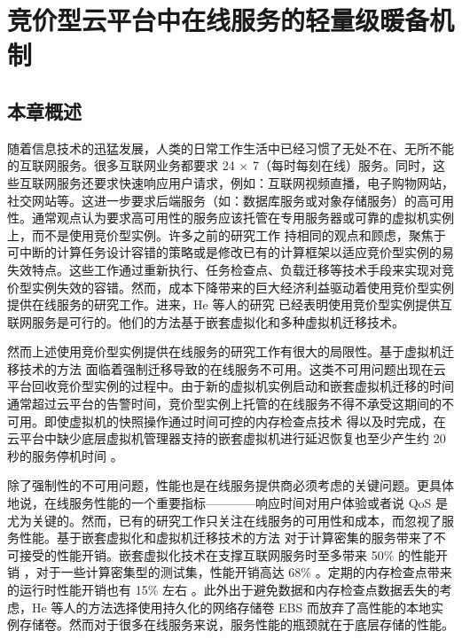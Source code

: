 \chapter{竞价型云平台中在线服务的轻量级暖备机制}
\label{cha:gemini}

\section{本章概述}
\label{sec:gemini_intro}
随着信息技术的迅猛发展，人类的日常工作生活中已经习惯了无处不在、无所不能的互联网服务。很多互联网业务都要求 24 $\times$ 7（每时每刻在线）服务。同时，这些互联网服务还要求快速响应用户请求，例如：互联网视频直播，电子购物网站，社交网站等。这进一步要求后端服务（如：数据库服务或对象存储服务）的高可用性。通常观点认为要求高可用性的服务应该托管在专用服务器或可靠的虚拟机实例上，而不是使用竞价型实例。许多之前的研究工作 \cite{chohan2010see, Liu:2011:CMC:2170444.2170450, song2012optimal, Yi:2010:RCS:1844768.1845343, Andrzejak:2010:DMC:1906481.1906533} 持相同的观点和顾虑，聚焦于可中断的计算任务设计容错的策略或是修改已有的计算框架以适应竞价型实例的易失效特点。这些工作通过重新执行、任务检查点、负载迁移等技术手段来实现对竞价型实例失效的容错。然而，成本下降带来的巨大经济利益驱动着使用竞价型实例提供在线服务的研究工作。进来，He 等人的研究 \cite{He:2015:CCH:2749246.2749275} 已经表明使用竞价型实例提供互联网服务是可行的。他们的方法基于嵌套虚拟化和多种虚拟机迁移技术。

然而上述使用竞价型实例提供在线服务的研究工作有很大的局限性。基于虚拟机迁移技术的方法 \cite{He:2015:CCH:2749246.2749275} 面临着强制迁移导致的在线服务不可用。这类不可用问题出现在云平台回收竞价型实例的过程中。由于新的虚拟机实例启动和嵌套虚拟机迁移的时间通常超过云平台的告警时间，竞价型实例上托管的在线服务不得不承受这期间的不可用。即使虚拟机的快照操作通过时间可控的内存检查点技术 \cite{Singh:2013:YEG:2482626.2482642} 得以及时完成，在云平台中缺少底层虚拟机管理器支持的嵌套虚拟机进行延迟恢复也至少产生约 20 秒的服务停机时间 \cite{Hines:2009:PBL:1508293.1508301}。

除了强制性的不可用问题，性能也是在线服务提供商必须考虑的关键问题。更具体地说，在线服务性能的一个重要指标————响应时间对用户体验或者说 QoS 是尤为关键的。然而，已有的研究工作只关注在线服务的可用性和成本，而忽视了服务性能。基于嵌套虚拟化和虚拟机迁移技术的方法 \cite{He:2015:CCH:2749246.2749275} 对于计算密集的服务带来了不可接受的性能开销。嵌套虚拟化技术在支撑互联网服务时至多带来 50\% 的性能开销 \cite{He:2015:CCH:2749246.2749275}，对于一些计算密集型的测试集，性能开销高达 68\% \cite{Williams:2012:XVO:2168836.2168849}。定期的内存检查点带来的运行时性能开销也有 15\% 左右 \cite{Sharma:2015:SDD:2741948.2741953}。此外出于避免数据和内存检查点数据丢失的考虑，He 等人的方法选择使用持久化的网络存储卷 EBS 而放弃了高性能的本地实例存储卷。然而对于很多在线服务来说，服务性能的瓶颈就在于底层存储的性能。

